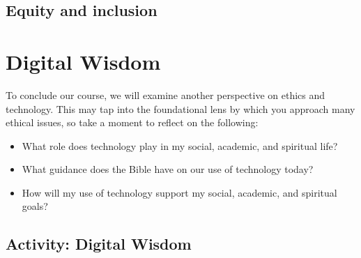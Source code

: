 \documentclass[
]{book}
\providecommand{\tightlist}{%
  \setlength{\itemsep}{0pt}\setlength{\parskip}{0pt}}
\theoremstyle{definition}
\theoremstyle{definition}
\theoremstyle{definition}
\theoremstyle{definition}
\theoremstyle{remark}
\begin{document}
\hypertarget{equity-and-inclusion}{%
\subsection*{Equity and inclusion}\label{equity-and-inclusion}}

\hypertarget{digital-wisdom}{%
\section{Digital Wisdom}\label{digital-wisdom}}

To conclude our course, we will examine another perspective on ethics and technology. This may tap into the foundational lens by which you approach many ethical issues, so take a moment to reflect on the following:

\begin{itemize}
\tightlist
\item
  What role does technology play in my social, academic, and spiritual life?\\
\item
  What guidance does the Bible have on our use of technology today?\\
\item
  How will my use of technology support my social, academic, and spiritual goals?
\end{itemize}

\hypertarget{activity-digital-wisdom}{%
\subsection*{Activity: Digital Wisdom}\label{activity-digital-wisdom}}
\end{document}
